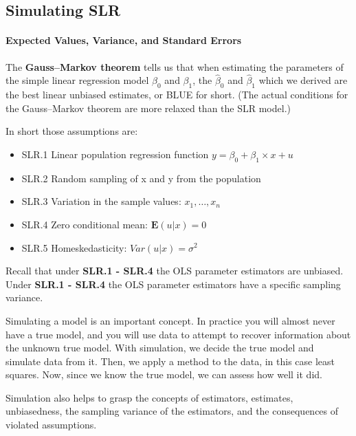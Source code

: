 \documentclass[]{book}
\providecommand{\tightlist}{%
  \setlength{\itemsep}{0pt}\setlength{\parskip}{0pt}}
\let\oldparagraph\paragraph
\renewcommand{\paragraph}[1]{\oldparagraph{#1}\mbox{}}
\begin{document}
\hypertarget{simulating-slr}{%
\subsection{Simulating SLR}\label{simulating-slr}}

\hypertarget{expected-values-variance-and-standard-errors}{%
\paragraph{Expected Values, Variance, and Standard
Errors}\label{expected-values-variance-and-standard-errors}}

The \textbf{Gauss--Markov theorem} tells us that when estimating the
parameters of the simple linear regression model \(\beta_{0}\) and
\(\beta_{1}\), the \(\hat{\beta}_{0}\) and \(\hat{\beta}_{1}\) which we
derived are the best linear unbiased estimates, or BLUE for short. (The
actual conditions for the Gauss--Markov theorem are more relaxed than
the SLR model.)

In short those assumptions are:

\begin{itemize}
\tightlist
\item
  SLR.1 Linear population regression function
  \(y = \beta_0 + \beta_{1} \times x + u\)
\item
  SLR.2 Random sampling of x and y from the population\\
\item
  SLR.3 Variation in the sample values: \(x_{1}, \dots , x_{n}\)
\item
  SLR.4 Zero conditional mean: \(\mathbf{E}(u|x) = 0\)
\item
  SLR.5 Homeskedasticity: \(Var(u|x) = \sigma^2\)
\end{itemize}

Recall that under \textbf{SLR.1 - SLR.4} the OLS parameter estimators
are unbiased. Under \textbf{SLR.1 - SLR.4} the OLS parameter estimators
have a specific sampling variance.

Simulating a model is an important concept. In practice you will almost
never have a true model, and you will use data to attempt to recover
information about the unknown true model. With simulation, we decide the
true model and simulate data from it. Then, we apply a method to the
data, in this case least squares. Now, since we know the true model, we
can assess how well it did.

Simulation also helps to grasp the concepts of estimators, estimates,
unbiasedness, the sampling variance of the estimators, and the
consequences of violated assumptions.
\end{document}
